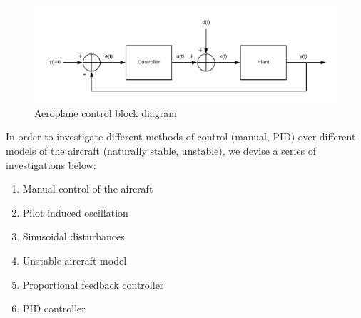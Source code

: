 \documentclass{article}
\begin{document}
\begin{figure}[htp]
	\centering
	\includegraphics[width=0.9\linewidth]{block_diagram.png}
	\caption{Aeroplane control block diagram}
	\label{fig:block}
\end{figure}
In order to investigate different methods of control (manual, PID) over different models of the aircraft (naturally stable, unstable), we devise a series of investigations below:
\begin{enumerate}
	\item Manual control of the aircraft
	\item Pilot induced oscillation
	\item Sinusoidal disturbances
	\item Unstable aircraft model
	\item Proportional feedback controller
	\item PID controller
\end{enumerate}
\end{document}
